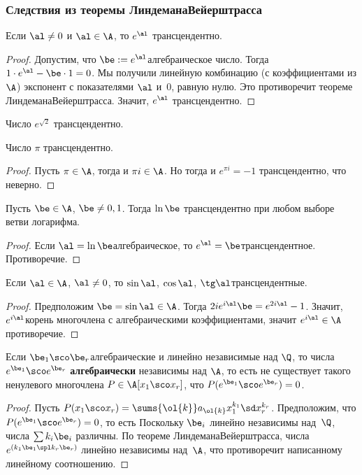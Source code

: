 \documentclass[a4paper]{article}
\begin{document}
\subsubsection{Следствия из теоремы Линдемана\ч Вейерштрасса}

\begin{imp}
Если $\al\neq0$ и $\al\in\A$, то $e^{\al}$ трансцендентно.
\end{imp}
\begin{proof}
Допустим, что $\be := e^\al$\т алгебраическое число. Тогда $1 \cdot e^\al - \be \cdot 1 = 0$.
Мы получили линейную комбинацию (с коэффициентами из $\A$) экспонент с показателями $\al$ и~$0$,
равную нулю. Это противоречит теореме Линдемана\ч Вейерштрасса. Значит, $e^\al$ трансцендентно.
\end{proof}

\begin{ex}
Число $e^{\sqrt{2}}$  трансцендентно.
\end{ex}

\begin{imp}
Число $\pi$ трансцендентно.
\end{imp}
\begin{proof}
Пусть $\pi\in\A$, тогда и $\pi i\in\A$. Но тогда и $e^{\pi i}=-1$ трансцендентно, что неверно.
\end{proof}

\begin{imp}
Пусть $\be\in\A$, $\be\neq0,1$. Тогда $\ln\be$ трансцендентно при любом выборе ветви логарифма.
\end{imp}
\begin{proof}
Если $\al=\ln\be$\т  алгебраическое, то $e^{\al}=\be$\т  трансцендентное. Противоречие.
\end{proof}

\begin{imp}
Если $\al\in\A$, $\al\neq0$, то $\sin\al$, $\cos\al$, $\tg\al$\т трансцендентные.
\end{imp}
\begin{proof}
Предположим $\be=\sin\al\in\A$. Тогда $2ie^{i\al}\be=e^{2i\al}-1$. Значит, $e^{i\al}$\т корень многочлена
с алгебраическими коэффициентами, значит $e^{i\al}\in\A$\т противоречие.
\end{proof}

\begin{imp}[Вейерштрасс]
Если $\be_1\sco \be_r$\т алгебраические и линейно независимые над $\Q$, то
числа $e^{\be_1}\sco e^{\be_r}$ \textbf{алгебраически} независимы над $\A$, то есть
не существует такого ненулевого многочлена $P \in\A[x_1\sco x_r]$, что $P(e^{\be_1}\sco e^{\be_r})=0$.
\end{imp}
\begin{proof}
Пусть $P(x_1\sco x_r)=\sums{\ol{k}}a_{\ol{k}} x_1^{k_1}\sd x_r^{k_r}$. Предположим, что
$P(e^{\be_1}\sco e^{\be_r})=0$, то есть
Поскольку $\be_i$ линейно независимы над~$\Q$, числа $\sum k_i\be_i$ различны. По теореме
Линдемана\ч Вейерштрасса, числа $e^{(k_1\be_1\spl k_r\be_r)}$ линейно независимы над~$\A$, что противоречит
написанному линейному соотношению.
\end{proof}
\end{document}
